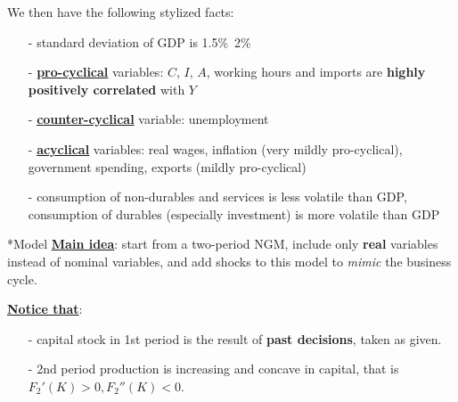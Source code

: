 \documentclass[10pt,landscape,a4paper]{article}
\makeatletter
\renewcommand{\subsection}{\@startsection{subsection}{1}{0mm}{.2ex}{.2ex}{\small\bfseries}}
\makeatother
\begin{document}
\begin{multicols*}{3}
We then have the following stylized facts:
\begin{itemize}
    \item[-] standard deviation of GDP is 1.5\%~2\%
    \item[-] \underline{\textbf{pro-cyclical}} variables: $C$, $I$, $A$, working hours and imports are \textbf{highly positively correlated} with $Y$
    \item[-] \underline{\textbf{counter-cyclical}} variable: unemployment
    \item[-] \underline{\textbf{acyclical}} variables: real wages, inflation (very mildly pro-cyclical), government spending, exports (mildly pro-cyclical)
    \item[-] consumption of non-durables and services is less volatile than GDP, consumption of durables (especially investment) is more volatile than GDP
\end{itemize}

\subsection*{Model}
\underline{\textbf{Main idea}}: start from a two-period NGM, include only \textbf{real} variables instead of nominal variables, and add shocks to this model to \textit{mimic} the business cycle.

\vspace{2pt}

\underline{\textbf{Notice that}}:
\begin{itemize}
    \item[-] capital stock in 1st period is the result of \textbf{past decisions}, taken as given.
    \item[-] 2nd period production is increasing and concave in capital, that is $F_2'(K)>0,F_2''(K)<0$.
\end{itemize}


\end{multicols*}
\end{document}
